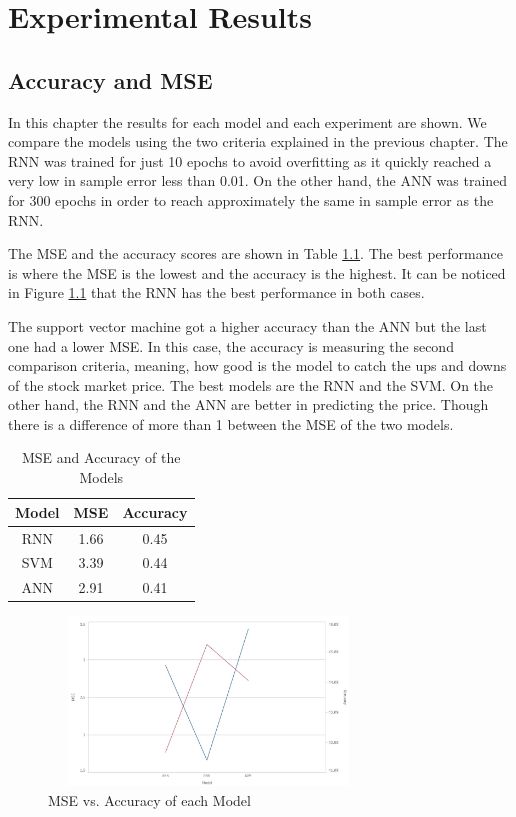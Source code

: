 \chapter{Experimental Results}
\label{ch:expResults}

\section{Accuracy and MSE}
In this chapter the results for each model and each experiment are shown. We compare the models using the two criteria explained in the previous chapter. The RNN was trained for just 10 epochs to avoid overfitting as it quickly reached a very low in sample error less than 0.01. On the other hand, the ANN was trained for 300 epochs in order to reach approximately the same in sample error as the RNN. 

The MSE and the accuracy scores are shown in Table \ref{table:accmse}. The best performance is where the MSE is the lowest and the accuracy is the highest. It can be noticed in Figure \ref{fig:accmse} that the RNN has the best performance in both cases.

The support vector machine got a higher accuracy than the ANN but the last one had a lower MSE. In this case, the accuracy is measuring the second comparison criteria, meaning, how good is the model to catch the ups and downs of the stock market price. The best models are the RNN and the SVM. On the other hand, the RNN and the ANN are better in predicting the price. Though there is a difference of more than 1 between the MSE of the two models.  

\begin{table}{}
\begin{center}
\begin{tabular}{ c | c | c }
    \hline
     \textbf{Model} &  \textbf{MSE} &    \textbf{Accuracy}\\ \hline
    RNN&  1.66&  0.45 \\ \hline
    SVM&  3.39&  0.44\\ \hline
    ANN&  2.91&  0.41\\ \hline
      \hline
  \end{tabular}
  \caption{MSE and Accuracy of the Models}
 \label{table:accmse}
\end{center}
 \end{table}

\begin{figure}
\label{fig:accmse}
\center
\includegraphics[width=8.5cm,height=4.5cm]{Figures/accmse.JPG}
\caption{MSE vs. Accuracy of each Model}
\end{figure}


